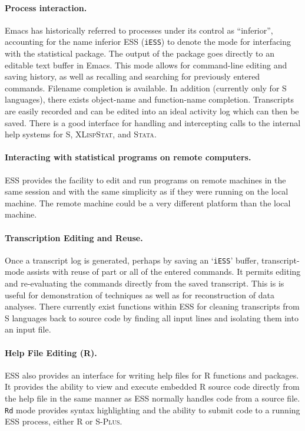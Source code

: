 \documentclass{article}
\newcommand*{\Splus}{\textsc{S-Plus}}
\newcommand*{\XLispStat}{\textsc{XLispStat}}
\newcommand*{\Stata}{\textsc{Stata}}
\newcommand{\stexttt}[1]{{\small\texttt{#1}}}
\newcommand{\file}[1]{`\stexttt{#1}'}
\begin{document}
\paragraph{Process interaction.}
Emacs has historically referred to processes under its control as
``inferior'', accounting for the name inferior ESS (\stexttt{iESS}) to
denote the mode for interfacing with the statistical package.  The
output of the package goes directly to an editable text buffer in Emacs.
This mode allows for command-line editing and saving history, as well as
recalling and searching for previously entered commands.  Filename
completion is available.  In addition (currently only for S languages),
there exists object-name and function-name completion.  Transcripts are
easily recorded and can be edited into an ideal activity log which can
then be saved.  There is a good interface for handling and intercepting
calls to the internal help systems for S, \XLispStat, and \Stata.

\paragraph{Interacting with statistical programs on remote computers.}
ESS provides the facility to edit and run programs on remote machines
in the same session and with the same simplicity as if they were
running on the local machine.  The remote machine could be a very
different platform than the local machine.

\paragraph{Transcription Editing and Reuse.}
Once a transcript log is generated, perhaps by saving an \file{iESS}
buffer, transcript-mode assists with reuse of part or all of the
entered commands.  It permits editing and re-evaluating the commands
directly from the saved transcript.  This is is useful for
demonstration of techniques as well as for reconstruction of data
analyses.  There currently exist functions within ESS for cleaning
transcripts from S languages back to source code by finding all input
lines and isolating them into an input file.

\paragraph{Help File Editing (R).}
ESS also provides an interface for writing help files for R functions
and packages.  It provides the ability to view and execute embedded R
source code directly from the help file in the same manner as ESS
normally handles code from a source file.  \stexttt{Rd} mode provides
syntax highlighting and the ability to submit code to a running ESS
process, either R or \Splus.
\end{document}
